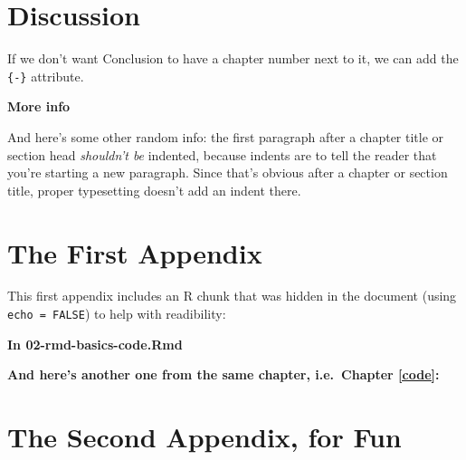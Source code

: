 \documentclass[a4paper, twoside]{templates/ociamthesis}
\newcommand*{\bibtitle}{References}
\begin{document}
\hypertarget{discussion-1}{%
\chapter*{Discussion}\label{discussion-1}}

If we don't want Conclusion to have a chapter number next to it, we can add the \texttt{\{-\}} attribute.

\textbf{More info}

And here's some other random info: the first paragraph after a chapter title or section head \emph{shouldn't be} indented, because indents are to tell the reader that you're starting a new paragraph. Since that's obvious after a chapter or section title, proper typesetting doesn't add an indent there.

\startappendices

\hypertarget{the-first-appendix}{%
\chapter{The First Appendix}\label{the-first-appendix}}

This first appendix includes an R chunk that was hidden in the document (using \texttt{echo\ =\ FALSE}) to help with readibility:

\textbf{In 02-rmd-basics-code.Rmd}

\textbf{And here's another one from the same chapter, i.e.~Chapter \ref{code}:}

\hypertarget{the-second-appendix-for-fun}{%
\chapter{The Second Appendix, for Fun}\label{the-second-appendix-for-fun}}




\setlength{\baselineskip}{0pt} %

{\renewcommand*\MakeUppercase[1]{#1}%
\printbibliography[heading=bibintoc,title={\bibtitle}]}
\end{document}
